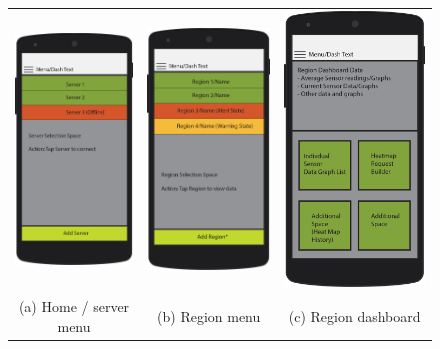 \documentclass{article}
\begin{document}
\begin{figure}[!htbp]
\begin{center}
\begin{tabular}{c c c}
\includegraphics[width=0.25\linewidth]{Images/bare-nexus-5-mockup-screen-home.png}&
\includegraphics[width=0.25\linewidth]{Images/bare-nexus-5-mockup-screen-region.png}&
\includegraphics[width=0.25\linewidth]{Images/bare-nexus-5-mockup-screen-region-dashboard.png}\\
\vspace{0.2in}
(a) Home / server menu & (b) Region menu & (c) Region dashboard\\


\end{tabular}
\end{center}
\end{figure}
\end{document}
